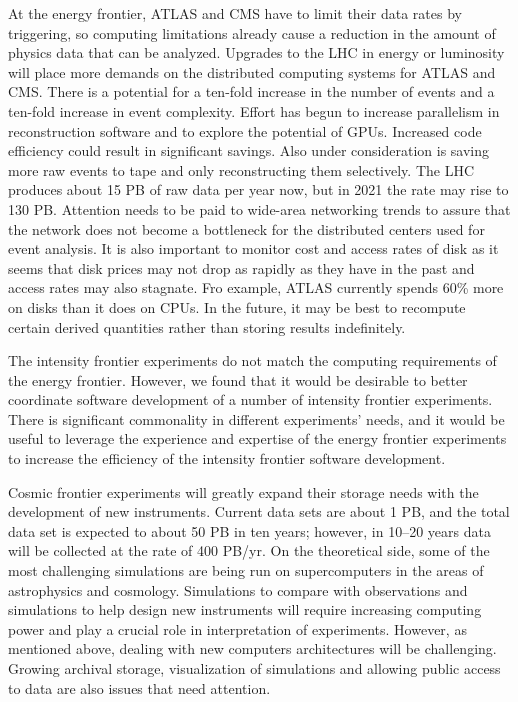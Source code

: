 At the energy frontier, ATLAS and CMS have to limit their data rates by triggering, so computing limitations already cause a reduction in the amount of physics data that can be analyzed. Upgrades to the LHC in energy or luminosity will place more demands on the distributed computing systems for ATLAS and CMS. There is a potential for a ten-fold increase in the number of events and a ten-fold increase in event complexity.  Effort has begun to increase parallelism in reconstruction software and to explore the potential of GPUs.  Increased code efficiency could result in significant savings.  Also under consideration is saving more raw events to tape and only reconstructing them selectively. The LHC produces about 15 PB of raw data per year now, but in 2021 the rate may rise to 130 PB.  Attention needs to be paid to wide-area networking trends to assure that the network does not become a bottleneck for the distributed centers used for event analysis. It is also important to monitor cost and access rates of disk as it seems that disk prices may not drop as rapidly as they have in the past and access rates may also stagnate.  Fro example, ATLAS currently spends 60\% more on disks than it does on CPUs.  In the future, it may be best to recompute certain derived quantities rather than storing results indefinitely.

The intensity frontier experiments do not match the computing requirements of the energy frontier.  However, we found that it would be desirable to better coordinate software development of a number of intensity frontier experiments.  There is significant commonality in different experiments' needs, and it would be useful to leverage the experience and expertise of the energy frontier experiments to increase the efficiency of the intensity frontier software development.

Cosmic frontier experiments will greatly expand their storage needs with the development of new instruments.  Current data sets are about 1 PB, and the total data set is expected to about 50 PB in ten years; however, in 10--20 years data will be collected at the rate of 400 PB/yr. On the theoretical side, some of the most challenging simulations are being run on supercomputers in the areas of astrophysics and cosmology. Simulations to compare with observations and simulations to help design new instruments will require increasing computing power and play a crucial role in interpretation of experiments.  However, as mentioned above, dealing with new computers architectures will be challenging.  Growing archival storage, visualization of simulations and allowing public access to data are also issues that need attention.

